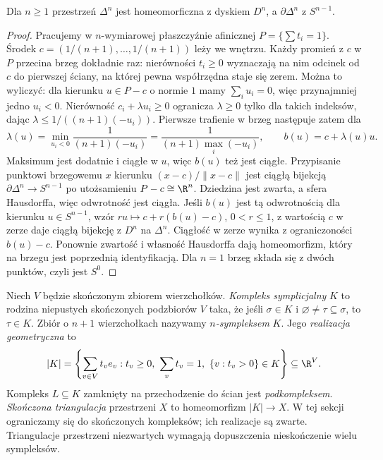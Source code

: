 \begin{stwierdzenie}
\label{prop:brzeg-sympleksu}
Dla $n\geq1$ przestrzeń $\Delta^n$
jest homeomorficzna z dyskiem $D^n$,
a $\partial\Delta^n$ z $S^{n-1}$.
\end{stwierdzenie}
\begin{proof}
Pracujemy w $n$-wymiarowej płaszczyźnie
afinicznej $P=\{\sum t_i=1\}$.
Środek $c=(1/(n+1),\ldots,1/(n+1))$
leży we wnętrzu. Każdy promień z $c$
w $P$ przecina brzeg dokładnie raz:
nierówności $t_i\geq0$ wyznaczają
na nim odcinek od $c$ do pierwszej
ściany, na której pewna współrzędna
staje się zerem.
Można to wyliczyć: dla kierunku $u\in P-c$ o normie $1$
mamy $\sum_i u_i=0$, więc przynajmniej jedno $u_i<0$.
Nierówność $c_i+\lambda u_i\geq0$ ogranicza $\lambda\geq0$
tylko dla takich indeksów, dając
$\lambda\leq1/((n+1)(-u_i))$.
Pierwsze trafienie w brzeg następuje zatem dla
\[
 \lambda(u)=\min_{u_i<0}\frac{1}{(n+1)(-u_i)}
           =\frac{1}{(n+1)\max_i(-u_i)},\qquad
 b(u)=c+\lambda(u)u.
\]
Maksimum jest dodatnie i ciągłe w $u$, więc $b(u)$ też jest ciągłe.
Przypisanie punktowi brzegowemu
$x$ kierunku $(x-c)/\|x-c\|$
jest ciągłą bijekcją
$\partial\Delta^n\to S^{n-1}$
po utożsamieniu $P-c\cong\R^n$.
Dziedzina jest zwarta, a sfera
Hausdorffa, więc odwrotność jest
ciągła. Jeśli $b(u)$ jest tą odwrotnością dla kierunku
$u\in S^{n-1}$, wzór $ru\mapsto c+r(b(u)-c)$, $0<r\leq1$,
z wartością $c$ w zerze daje ciągłą bijekcję z $D^n$ na $\Delta^n$.
Ciągłość w zerze wynika z ograniczoności $b(u)-c$.
Ponownie zwartość i własność Hausdorffa dają homeomorfizm,
który na brzegu jest poprzednią identyfikacją. Dla $n=1$ brzeg
składa się z dwóch punktów,
czyli jest $S^0$.
\end{proof}

\begin{definicja}
\label{def:kompleks-symplicjalny}
Niech $V$ będzie skończonym zbiorem
wierzchołków. \emph{Kompleks symplicjalny}
$K$ to rodzina niepustych skończonych
podzbiorów $V$ taka, że jeśli
$\sigma\in K$ i $\varnothing\ne\tau\subseteq\sigma$,
to $\tau\in K$. Zbiór o $n+1$
wierzchołkach nazywamy
\emph{$n$-sympleksem} $K$.
Jego \emph{realizacja geometryczna} to
\[
 |K|=\left\{\sum_{v\in V}t_v e_v:
 t_v\geq0,\ \sum_v t_v=1,\
 \{v:t_v>0\}\in K\right\}\subseteq\R^{V}.
\]
Kompleks $L\subseteq K$ zamknięty
na przechodzenie do ścian jest
\emph{podkompleksem}.
\emph{Skończona triangulacja} przestrzeni $X$
to homeomorfizm $|K|\to X$. W tej sekcji ograniczamy się do
skończonych kompleksów; ich realizacje są zwarte. Triangulacje
przestrzeni niezwartych wymagają dopuszczenia nieskończenie wielu sympleksów.
\end{definicja}

